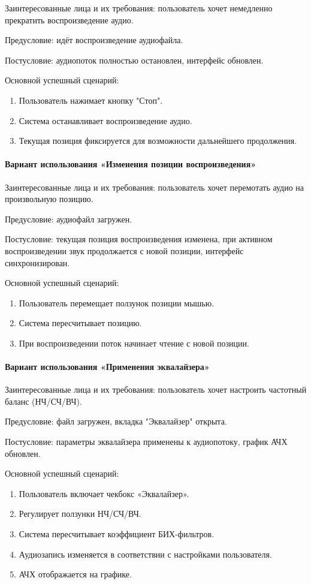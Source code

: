 Заинтересованные лица и их требования: пользователь хочет немедленно прекратить воспроизведение аудио.

Предусловие: идёт воспроизведение аудиофайла.

Постусловие: аудиопоток полностью остановлен, интерфейс обновлен.

Основной успешный сценарий:
\begin{enumerate}
	\item Пользователь нажимает кнопку "Стоп".
	\item Система останавливает воспроизведение аудио.
	\item Текущая позиция фиксируется для возможности дальнейшего продолжения.
\end{enumerate}

\paragraph{Вариант использования «Изменения позиции воспроизведения»}

Заинтересованные лица и их требования: пользователь хочет перемотать аудио на произвольную позицию.

Предусловие: аудиофайл загружен.

Постусловие: текущая позиция воспроизведения изменена, при активном воспроизведении звук продолжается с новой позиции, интерфейс синхронизирован.

Основной успешный сценарий:
\begin{enumerate}
	\item Пользователь перемещает ползунок позиции мышью.
	\item Система пересчитывает позицию.
	\item При воспроизведении поток начинает чтение с новой позиции.
\end{enumerate}

\paragraph{Вариант использования «Применения эквалайзера»}

Заинтересованные лица и их требования: пользователь хочет настроить частотный баланс (НЧ/СЧ/ВЧ).

Предусловие: файл загружен, вкладка "Эквалайзер" открыта.

Постусловие: параметры эквалайзера применены к аудиопотоку, график АЧХ обновлен.

Основной успешный сценарий:
\begin{enumerate}
	\item Пользователь включает чекбокс «Эквалайзер».
	\item Регулирует ползунки НЧ/СЧ/ВЧ.
	\item Система пересчитывает коэффициент БИХ-фильтров.
	\item Аудиозапись изменяется в соответствии с настройками пользователя.
	\item АЧХ отображается на графике.
\end{enumerate}

